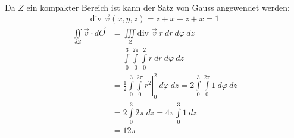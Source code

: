 \documentclass[10pt,a4paper,parskip=half]{scrartcl}
\begin{document}
\begin{enumerate}[(a)]
   Da $Z$ ein kompakter Bereich ist kann der Satz von Gauss angewendet werden:
   \[ \text{div } \vec v(x,y,z) =  z + x - z + x = 1\]
      \begin{align*}
            \iint\limits_{\delta Z} \vec v \cdot d \vec O &= \iiint\limits_{Z} \text{div } \vec v~ r~dr ~d\varphi~ dz \\
            &= \int\limits_{0}^3\int\limits_0^{2\pi}\int\limits_0^2  r~dr ~d\varphi~ dz \\
            &= \frac 12 \left.\int\limits_{0}^3\int\limits_0^{2\pi} r^2 \right|^2_0 ~d\varphi ~ dz  = 2 \int\limits_{0}^3\int\limits_0^{2\pi} 1 ~d\varphi ~dz \\
            &= 2 \int\limits_{0}^3 2\pi  ~dz = 4\pi \int\limits_{0}^3 1 ~dz \\
            &= 12 \pi
      \end{align*}
\end{enumerate}
\end{document}
